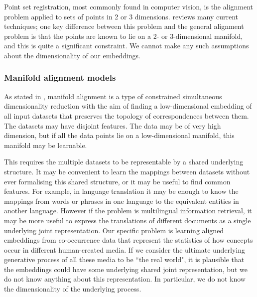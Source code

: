 Point set registration, most commonly found in computer vision, is the alignment problem applied to sets of points in 2 or 3 dimensions. \cite{PointSetRegistrationReview} reviews many current techniques; one key difference between this problem and the general alignment problem is that the points are known to lie on a 2- or 3-dimensional manifold, and this is quite a significant constraint. We cannot make any such assumptions about the dimensionality of our embeddings. 

\subsubsection{Manifold alignment models}

As stated in \cite{ManifoldLearningTheoryAndApplications}, manifold alignment is a type of constrained simultaneous dimensionality reduction with the aim of finding a low-dimensional embedding of all input datasets that preserves the topology of correspondences between them. The datasets may have disjoint features. The data may be of very high dimension, but if all the data points lie on a low-dimensional manifold, this manifold may be learnable.  

This requires the multiple datasets to be representable by a shared underlying structure. It may be convenient to learn the mappings between datasets without ever formalising this shared structure, or it may be useful to find common features. For example, in language translation it may be enough to know the mappings from words or phrases in one language to the equivalent entities in another language. However if the problem is multilingual information retrieval, it may be more useful to express the translations of different documents as a single underlying joint representation. Our specific problem is learning aligned embeddings from co-occurrence data that represent the statistics of how concepts occur in different human-created media. If we consider the ultimate underlying generative process of all these media to be ``the real world", it is plausible that the embeddings could have some underlying shared joint representation, but we do not know anything about this representation. In particular, we do not know the dimensionality of the underlying process. 


